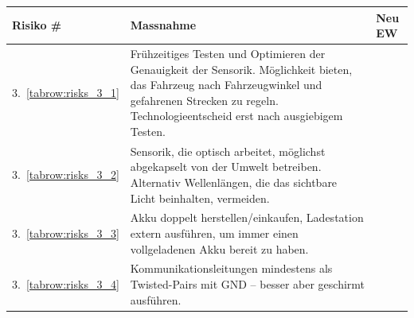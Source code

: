 \documentclass[main.tex]{subfiles} %
\begin{document}
\begin{table}[H]
    \begin{tabularx}{\textwidth}{|>{\centering\arraybackslash}p{2cm}|>{\raggedright\arraybackslash}X|>{\centering\arraybackslash}p{0.75cm}|}
        \hline
        \textbf{Risiko \#}        & \textbf{Massnahme}
                                  & \textbf{Neu EW}                                                                                                                                                                                             \\

        \hline
        \rowcolor{yellow!30}
        3.~\ref{tabrow:risks_3_1} & Frühzeitiges Testen und Optimieren der Genauigkeit der Sensorik. Möglichkeit bieten, das Fahrzeug nach Fahrzeugwinkel und gefahrenen Strecken zu regeln. Technologieentscheid erst nach ausgiebigem Testen.
                                  & 2                                                                                                                                                                                                           \\

        \hline
        \rowcolor{yellow!30}
        3.~\ref{tabrow:risks_3_2} & Sensorik, die optisch arbeitet, möglichst abgekapselt von der Umwelt betreiben. Alternativ Wellenlängen, die das sichtbare Licht beinhalten, vermeiden.
                                  & 3                                                                                                                                                                                                           \\

        \hline
        \rowcolor{green!30}
        3.~\ref{tabrow:risks_3_3} & Akku doppelt herstellen/einkaufen, Ladestation extern ausführen, um immer einen vollgeladenen Akku bereit zu haben.
                                  & 1                                                                                                                                                                                                           \\

        \hline
        \rowcolor{green!30}
        3.~\ref{tabrow:risks_3_4} & Kommunikationsleitungen mindestens als Twisted-Pairs mit GND – besser aber geschirmt ausführen.
                                  & 1                                                                                                                                                                                                           \\


\end{tabularx}
\end{table}
\end{document}

